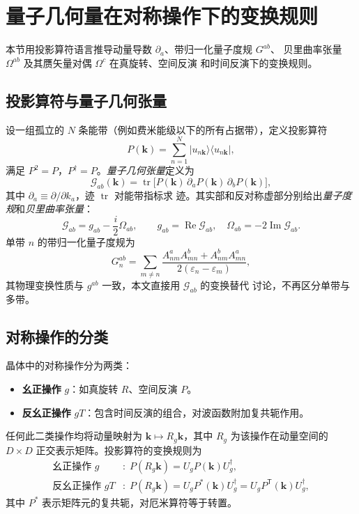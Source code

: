 \section{量子几何量在对称操作下的变换规则}

本节用投影算符语言推导动量导数 \(\partial_a\)、带归一化量子度规 \(G^{ab}\)、
贝里曲率张量 \(\Omega^{ab}\) 及其赝矢量对偶 \(\Omega^c\) 在真旋转、空间反演
和时间反演下的变换规则。

\subsection{投影算符与量子几何张量}

设一组孤立的 \(N\) 条能带（例如费米能级以下的所有占据带），定义投影算符
\begin{equation}
  P(\mathbf{k}) = \sum_{n=1}^{N} \lvert u_{n\mathbf{k}}\rangle\langle u_{n\mathbf{k}}\rvert,
\end{equation}
满足 \(P^2 = P\)，\(P^\dagger = P\)。\textit{量子几何张量}定义为
\begin{equation}
  \mathcal{G}_{ab}(\mathbf{k}) = \operatorname{tr}\bigl[ P(\mathbf{k})\,
  \partial_a P(\mathbf{k})\, \partial_b P(\mathbf{k}) \bigr],
  \label{eq:Gdef}
\end{equation}
其中 \(\partial_a \equiv \partial/\partial k_a\)，迹 \(\operatorname{tr}\) 对能带指标求
迹。其实部和反对称虚部分别给出\textit{量子度规}和\textit{贝里曲率张量}：
\begin{equation}
  \mathcal{G}_{ab} = g_{ab} - \frac{i}{2}\Omega_{ab},
  \qquad
  g_{ab} = \operatorname{Re}\mathcal{G}_{ab},\quad
  \Omega_{ab} = -2\operatorname{Im}\mathcal{G}_{ab}.
\end{equation}
单带 \(n\) 的带归一化量子度规为
\begin{equation}
  G_n^{ab} = \sum_{m\neq n}
  \frac{A_{nm}^a A_{mn}^b + A_{nm}^b A_{mn}^a}{2(\varepsilon_n-\varepsilon_m)},
\end{equation}
其物理变换性质与 \(g^{ab}\) 一致，本文直接用 \(\mathcal{G}_{ab}\) 的变换替代
讨论，不再区分单带与多带。

\subsection{对称操作的分类}

晶体中的对称操作分为两类：
\begin{itemize}
  \item \textbf{幺正操作} \(g\)：如真旋转 \(R\)、空间反演 \(P\)。
  \item \textbf{反幺正操作} \(gT\)：包含时间反演的组合，对波函数附加复共轭作用。
\end{itemize}
任何此二类操作均将动量映射为 \(\mathbf{k} \mapsto R_g\mathbf{k}\)，其中 \(R_g\)
为该操作在动量空间的 \(D\times D\) 正交表示矩阵。投影算符的变换规则为
\begin{align}
  \text{幺正操作 } g &: \; P(R_g\mathbf{k}) = U_g P(\mathbf{k}) U_g^\dagger,
    \label{eq:Pg}\\
  \text{反幺正操作 } gT &: \; P(R_g\mathbf{k}) = U_g P^*(\mathbf{k}) U_g^\dagger
    = U_g P^{\mathsf{T}}(\mathbf{k}) U_g^\dagger,
    \label{eq:PgT}
\end{align}
其中 \(P^*\) 表示矩阵元的复共轭，对厄米算符等于转置。


